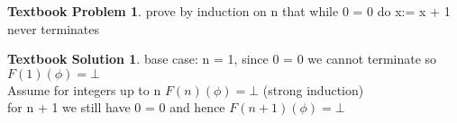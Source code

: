 \documentclass[10pt]{article}
\theoremstyle{definition}
\newtheorem{bp}{Textbook Problem}
\newtheorem{ts}{Textbook Solution}
\begin{document}
  \begin{bp}
      prove by induction on n that while 0 = 0 do x:= x + 1 never terminates
  \end{bp}
  
  \begin{ts}
  base case: n = 1, since 0 = 0 we cannot terminate so $F(1)(\phi) = \bot$ \\
  Assume for integers up to n $F(n)(\phi) = \bot$ (strong induction) \\
  for n + 1 we still have 0 = 0 and hence $F(n+1)(\phi) = \bot$
  \end{ts}

  

  

  
\end{document}

